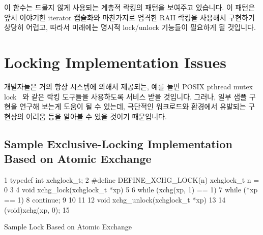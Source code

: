 이 함수는 드물지 않게 사용되는 계층적 락킹의 패턴을 보여주고 있습니다.
이 패턴은 앞서 이야기한 iterator 캡슐화와 마찬가지로 엄격한 RAII 락킹을
사용해서 구현하기 상당히 어렵고, 따라서 미래에는 명시적 lock/unlock 기능들이
필요하게 될 것입니다.

\section{Locking Implementation Issues}
\label{sec:locking:Locking Implementation Issues}

개발자들은 거의 항상 시스템에 의해서 제공되는, 예를 들면 POSIX pthread mutex
lock~\cite{OpenGroup1997pthreads,Butenhof1997pthreads} 와 같은 락킹 도구들을
사용하도록 서비스 받을 것입니다.
그러나, 일부 샘플 구현을 연구해 보는게 도움이 될 수 있는데, 극단적인 워크로드와
환경에서 유발되는 구현상의 어려움 등을 알아볼 수 있을 것이기 때문입니다.

\subsection{Sample Exclusive-Locking Implementation Based on Atomic Exchange}
\label{sec:locking:Sample Exclusive-Locking Implementation Based on Atomic Exchange}

\begin{listing}[tbp]
{ \scriptsize
\begin{verbbox}
  1 typedef int xchglock_t;
  2 #define DEFINE_XCHG_LOCK(n) xchglock_t n = 0
  3 
  4 void xchg_lock(xchglock_t *xp)
  5 {
  6   while (xchg(xp, 1) == 1) {
  7     while (*xp == 1)
  8       continue;
  9   }
 10 }
 11 
 12 void xchg_unlock(xchglock_t *xp)
 13 {
 14   (void)xchg(xp, 0);
 15 }
\end{verbbox}
}
\centering
\theverbbox
\caption{Sample Lock Based on Atomic Exchange}
\label{lst:locking:Sample Lock Based on Atomic Exchange}
\end{listing}

